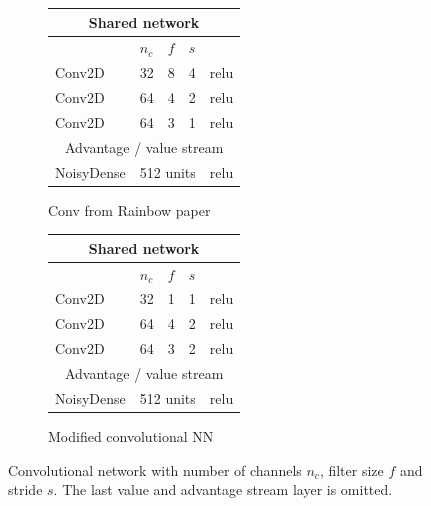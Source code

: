 \begin{figure}
  \centering
  \begin{subfigure}[b]{0.48\linewidth}
    \centering
	\begin{tabular}{l l l l l}
		\multicolumn{5}{c}{Shared network} \\
		\midrule
		& $n_c$ & $f$ & $s$ & \\
		\midrule
		Conv2D & 32 & 8 & 4 & relu \\
		Conv2D & 64 & 4 & 2 & relu \\
		Conv2D & 64 & 3 & 1 & relu \\
		\toprule
		\multicolumn{5}{c}{Advantage / value stream} \\
		\midrule
		NoisyDense & \multicolumn{3}{l}{512 units} & relu \\
		\toprule
	\end{tabular}
    \caption{Conv from Rainbow paper\cite{Hessel2018RainbowCI}}
    \label{fig:conv-original}
  \end{subfigure}
  \begin{subfigure}[b]{0.48\linewidth}
    \centering
	\begin{tabular}{l l l l l}
		\multicolumn{5}{c}{Shared network} \\
		\midrule
		& $n_c$ & $f$ & $s$ & \\
		\midrule
		Conv2D & 32 & 1 & 1 & relu \\
		Conv2D & 64 & 4 & 2 & relu \\
		Conv2D & 64 & 3 & 2 & relu \\
		\toprule
		\multicolumn{5}{c}{Advantage / value stream} \\
		\midrule
		NoisyDense & \multicolumn{3}{l}{512 units} & relu \\
		\toprule
	\end{tabular}
    \caption{Modified convolutional NN}
    \label{fig:conv-modified}
  \end{subfigure}
  \caption{Convolutional network with number of channels $n_c$, filter size $f$ and stride $s$. The last value and advantage stream layer is omitted.}
  \label{fig:conv-arch}
\end{figure}

